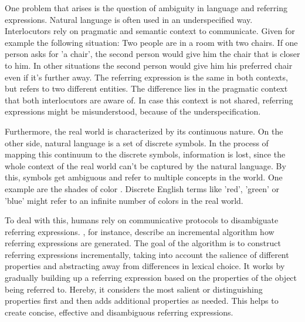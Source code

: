 One problem that arises is the question of ambiguity in language and referring expressions.
Natural language is often used in an underspecified way.
Interlocutors rely on pragmatic and semantic context to communicate.
Given for example the following situation:
Two people are in a room with two chairs.
If one person asks for 'a chair', the second person would give him the chair that is closer to him.
In other situations the second person would give him his preferred chair even if it's further away.
The referring expression is the same in both contexts, but refers to two different entities.
The difference lies in the pragmatic context that both interlocutors are aware of.
In case this context is not shared, referring expressions might be misunderstood, because of the underspecification.

Furthermore, the real world is characterized by its continuous nature.
On the other side, natural language is a set of discrete symbols.
In the process of mapping this continuum to the discrete symbols, information is lost, since the whole context of the real world can't be captured by the natural language.
By this, symbols get ambiguous and refer to multiple concepts in the world.
One example are the shades of color \citep{Zaslavsky2018}.
Discrete English terms like 'red', 'green' or 'blue' might refer to an infinite number of colors in the real world.

To deal with this, humans rely on communicative protocols to disambiguate referring expressions.
\citet{Dale1995}, for instance, describe an incremental algorithm how referring expressions are generated.
The goal of the algorithm is to construct referring expressions incrementally, taking into account the salience of different properties and abstracting away from differences in lexical choice.
It works by gradually building up a referring expression based on the properties of the object being referred to.
Hereby, it considers the most salient or distinguishing properties first and then adds additional properties as needed.
This helps to create concise, effective and disambiguous referring expressions.

